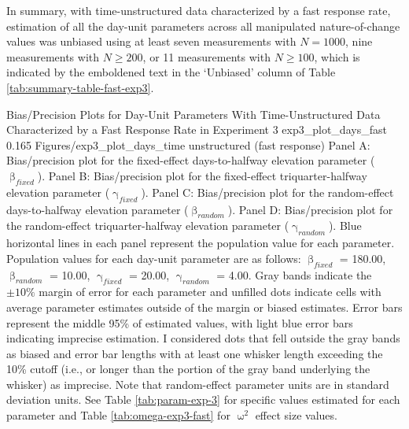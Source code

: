 \documentclass[
12pt, %
twoside,
english]{guelphthesis}
\begin{document}
In summary, with time-unstructured data characterized by a fast response rate, estimation of all the day-unit parameters across all manipulated nature-of-change values was unbiased using at least seven measurements with \(N = 1000\), nine measurements with \(N \ge 200\), or 11 measurements with \(N \ge 100\), which is indicated by the emboldened text in the `Unbiased' column of Table \ref{tab:summary-table-fast-exp3}.
\begin{apaFigure}
[portrait]
[samepage]
[-0.2cm]
{Bias/Precision Plots for Day-Unit Parameters With Time-Unstructured Data Characterized by a Fast Response Rate in Experiment 3}
{exp3_plot_days_fast}
{0.165}
{Figures/exp3_plot_days_time unstructured (fast response)}
{Panel A: Bias/precision plot for the fixed-effect days-to-halfway elevation parameter ($\upbeta_{fixed}$). Panel B: Bias/precision plot for the fixed-effect triquarter-halfway elevation parameter ($\upgamma_{fixed}$). Panel C: Bias/precision plot for the random-effect days-to-halfway elevation parameter ($\upbeta_{random}$). Panel D: Bias/precision plot for the random-effect triquarter-halfway elevation parameter ($\upgamma_{random}$). Blue horizontal lines in each panel represent the population value for each parameter. Population values for each day-unit parameter are as follows: $\upbeta_{fixed}$ = 180.00, $\upbeta_{random}$ = 10.00, $\upgamma_{fixed}$ = 20.00, $\upgamma_{random}$ = 4.00. Gray bands indicate the $\pm 10\%$ margin of error for each parameter and unfilled dots indicate cells with average parameter estimates outside of the margin or biased estimates. Error bars represent the middle 95\% of estimated values, with light blue error bars indicating imprecise estimation. I considered dots that fell outside the gray bands as biased and error bar lengths with at least one whisker length exceeding the 10\% cutoff (i.e., or longer than the portion of the gray band underlying the whisker) as imprecise. Note that random-effect parameter units are in standard deviation units. See Table \ref{tab:param-exp-3} for specific values estimated for each parameter and Table \ref{tab:omega-exp3-fast} for $\upomega^2$ effect size values.}
\end{apaFigure}
\end{document}
